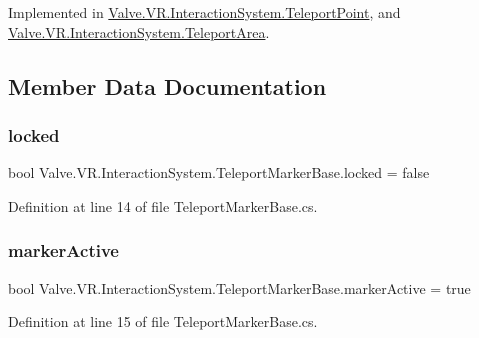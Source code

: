 Implemented in \mbox{\hyperlink{class_valve_1_1_v_r_1_1_interaction_system_1_1_teleport_point_aa62afea7412cbca6a7e5016b4a5788c6}{Valve.\+V\+R.\+Interaction\+System.\+Teleport\+Point}}, and \mbox{\hyperlink{class_valve_1_1_v_r_1_1_interaction_system_1_1_teleport_area_a385c0b75611a1d7b120fc5e45e69730e}{Valve.\+V\+R.\+Interaction\+System.\+Teleport\+Area}}.



\subsection{Member Data Documentation}
\mbox{\label{class_valve_1_1_v_r_1_1_interaction_system_1_1_teleport_marker_base_a0fe663ebf0fb74cfb7d6f5ca28c83493}} 
\subsubsection{\texorpdfstring{locked}{locked}}
{\footnotesize\ttfamily bool Valve.\+V\+R.\+Interaction\+System.\+Teleport\+Marker\+Base.\+locked = false}



Definition at line 14 of file Teleport\+Marker\+Base.\+cs.

\mbox{\label{class_valve_1_1_v_r_1_1_interaction_system_1_1_teleport_marker_base_ac2f72ac96272eea62a0b5aa9bbd202b7}} 
\subsubsection{\texorpdfstring{markerActive}{markerActive}}
{\footnotesize\ttfamily bool Valve.\+V\+R.\+Interaction\+System.\+Teleport\+Marker\+Base.\+marker\+Active = true}



Definition at line 15 of file Teleport\+Marker\+Base.\+cs.



